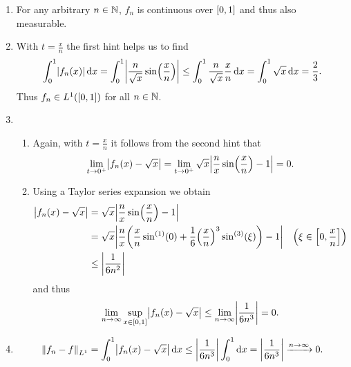 \documentclass{exercise}
\begin{document}
	\begin{enumerate}
		\item For any arbitrary \(n \in \N\), \(f_n\) is continuous over \(\brackets*{0, 1}\) and thus also measurable.
		\item With \(t = \frac{x}{n}\) the first hint helps us to find
		\[
			\int_0^1 \absolute*{f_n\parentheses*{x}}\d x = \int_0^1 \absolute*{\frac{n}{\sqrt{x}}\sin\parentheses*{\frac{x}{n}}} \le \int_0^1 \frac{n}{\sqrt{x}}\frac{x}{n}\d x = \int_0^1 \sqrt{x}\d x = \frac{2}{3}.
		\]
		Thus \(f_n \in L^1\parentheses*{\brackets*{0, 1}}\) for all \(n \in \N\).
		\item
		\begin{enumerate}
			\item Again, with \(t = \frac{x}{n}\) it follows from the second hint that
			\[
				\lim_{t \to 0^+}\absolute*{f_n\parentheses*{x} - \sqrt{x}} = \lim_{t \to 0^+}\sqrt{x}\absolute*{\frac{n}{x}\sin\parentheses*{\frac{x}{n}} - 1} = 0.
			\]
			\item Using a Taylor series expansion we obtain
			\begin{align*}
				\absolute*{f_n\parentheses*{x} - \sqrt{x}} &= \sqrt{x}\absolute*{\frac{n}{x}\sin\parentheses*{\frac{x}{n}} - 1}\\
				&= \sqrt{x}\absolute*{\frac{n}{x}\parentheses*{\frac{x}{n}\sin^{\parentheses*{1}}\parentheses*{0} + \frac{1}{6}\parentheses*{\frac{x}{n}}^3 \sin^{\parentheses*{3}}\parentheses*{\xi}} - 1} \quad \parentheses*{\xi \in \brackets*{0, \frac{x}{n}}}\\
				&\le \absolute*{\frac{1}{6n^2}}
			\end{align*}
			and thus
			\[
				\lim_{n \to \infty}\sup_{x \in \brackets*{0, 1}}\absolute*{f_n\parentheses*{x} - \sqrt{x}} \le \lim_{n \to \infty}\absolute*{\frac{1}{6n^3}} = 0.
			\]
		\end{enumerate}
		\item
		\[
			\norm*{f_n - f}_{L^1} = \int_0^1 \absolute*{f_n\parentheses*{x} - \sqrt{x}}\d x \le \absolute*{\frac{1}{6n^3}}\int_0^1 \d x = \absolute*{\frac{1}{6n^3}} \xrightarrow{n \to \infty} 0.
		\]
	\end{enumerate}


	\section{}
\end{document}
